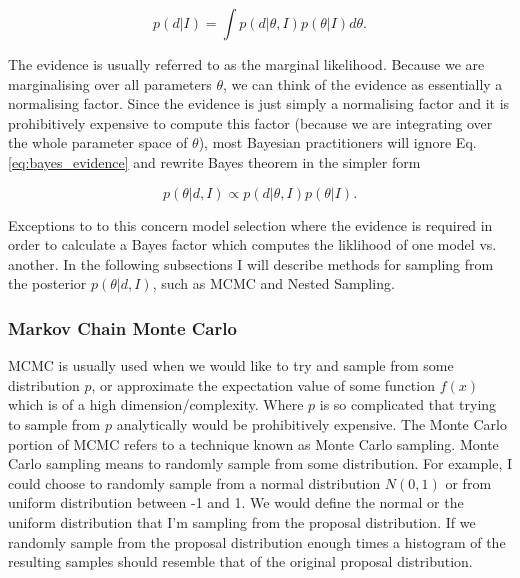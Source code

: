 \begin{equation}
    p(d|I) = \int p(d|\theta,I) p(\theta|I) d\theta.
    \label{eq:bayes_evidence}
\end{equation}

The evidence is usually referred to as the marginal likelihood. Because we are marginalising over all parameters $\theta$, we can think of the evidence as essentially a normalising factor. Since the evidence is just simply a normalising factor and it is prohibitively expensive to compute this factor (because we are integrating over the whole parameter space of $\theta$), most Bayesian practitioners will ignore Eq. \ref{eq:bayes_evidence} and rewrite Bayes theorem in the simpler form 

\begin{equation}
    p(\theta | d, I) \propto p(d | \theta,I) p(\theta|I).
\end{equation}

%
%
Exceptions to to this concern model selection where the evidence is required 
in order to calculate a Bayes factor which computes the liklihood of 
one model vs. another. In the following subsections I will describe 
methods for sampling from the posterior $p(\theta|d,I)$, such as \ac{MCMC} and 
Nested Sampling.

\subsubsection{Markov Chain Monte Carlo}

%
\ac{MCMC} is usually used when we would like to try and sample from some distribution $p$, or approximate the expectation value of some function $f(x)$ which is of a high dimension/complexity. Where $p$ is so complicated that trying to sample from $p$ analytically would be prohibitively expensive. The Monte Carlo portion of \ac{MCMC} refers to a technique known as Monte Carlo sampling. Monte Carlo sampling means to randomly sample from some distribution. For example, I could choose to randomly sample from a normal distribution $N(0,1)$ or from uniform distribution between -1 and 1. We would define the normal or the uniform distribution that I'm sampling from the proposal distribution. If we randomly sample from the proposal distribution enough times a histogram of the resulting samples should resemble that of the original proposal distribution. 

